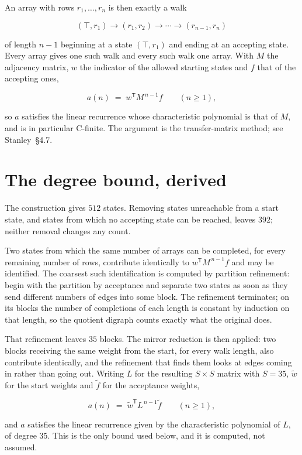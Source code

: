 \documentclass[11pt]{article}
\theoremstyle{definition}
\begin{document}
An array with rows $r_1,\dots,r_n$ is then exactly a walk

\[(\top,r_1) \to (r_1,r_2) \to \cdots \to (r_{n-1},r_n)\]

of length $n-1$ beginning at a state $(\top,r_1)$ and ending at an accepting state. Every array gives one such walk and every such walk one array. With $M$ the adjacency matrix, $w$ the indicator of the allowed starting states and $f$ that of the accepting ones,

\[a(n) \;=\; w^{\mathsf T} M^{\,n-1} f \qquad (n \ge 1),\]

so $a$ satisfies the linear recurrence whose characteristic polynomial is that of $M$, and is in particular C-finite. The argument is the transfer-matrix method; see Stanley~\S4.7.

\section{The degree bound, derived}

The construction gives $512$ states. Removing states unreachable from a start state, and states from which no accepting state can be reached, leaves $392$; neither removal changes any count.

Two states from which the same number of arrays can be completed, for every remaining number of rows, contribute identically to $w^{\mathsf T}M^{\,n-1}f$ and may be identified. The coarsest such identification is computed by partition refinement: begin with the partition by acceptance and separate two states as soon as they send different numbers of edges into some block. The refinement terminates; on its blocks the number of completions of each length is constant by induction on that length, so the quotient digraph counts exactly what the original does.

That refinement leaves $35$ blocks. The mirror reduction is then applied: two blocks receiving the same weight from the start, for every walk length, also contribute identically, and the refinement that finds them looks at edges coming in rather than going out. Writing $L$ for the resulting $S \times S$ matrix with $S = 35$, $\tilde w$ for the start weights and $\tilde f$ for the acceptance weights,

\[a(n) \;=\; \tilde w^{\mathsf T} L^{\,n-1} \tilde f \qquad (n \ge 1),\]

and $a$ satisfies the linear recurrence given by the characteristic polynomial of $L$, of degree $35$. This is the only bound used below, and it is computed, not assumed.
\end{document}

